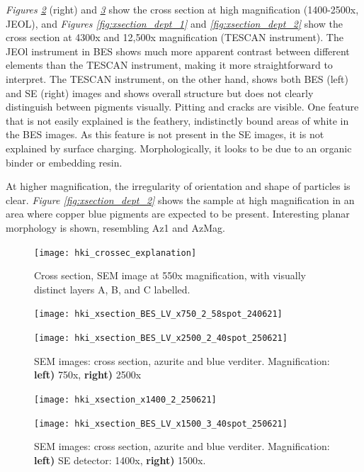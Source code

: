 \textit{Figures \ref{fig:xsection_jeol_1}} (right) and \textit{\ref{fig:xsection_jeol_2}} show the cross section at high magnification (1400-2500x, JEOL), and \textit{Figures \ref{fig:xsection_dept_1}} and \textit{\ref{fig:xsection_dept_2}} show the cross section at 4300x and 12,500x magnification (TESCAN instrument). The JEOl instrument in BES shows much more apparent contrast between different elements than the TESCAN instrument, making it more straightforward to interpret. The TESCAN instrument, on the other hand, shows both BES (left) and SE (right) images and shows overall structure but does not clearly distinguish between pigments visually. Pitting and cracks are visible. One feature that is not easily explained is the feathery, indistinctly bound areas of white in the BES images. As this feature is not present in the SE images, it is not explained by surface charging. Morphologically, it looks to be due to an organic binder or embedding resin.

At higher magnification, the irregularity of orientation and shape of particles is clear. \textit{Figure \ref{fig:xsection_dept_2}} shows the sample at high magnification in an area where copper blue pigments are expected to be present. Interesting planar morphology is shown, resembling Az1 and AzMag.

\begin{figure}[H]
\centering
  \texttt{[image: hki\_crossec\_explanation]}
\caption[Cross section with visually distinct layers A, B, and C labelled]{Cross section, SEM image at 550x magnification, with visually distinct layers A, B, and C labelled.}
\label{fig:hki_crossec_explanation}
\end{figure}

\begin{figure}[H]
\centering
\begin{minipage}{.45\textwidth}
  \centering
  \texttt{[image: hki\_xsection\_BES\_LV\_x750\_2\_58spot\_240621]}     
\end{minipage}
\begin{minipage}{.45\textwidth}
  \centering
  \texttt{[image: hki\_xsection\_BES\_LV\_x2500\_2\_40spot\_250621]}    
\end{minipage}
\caption[SEM images: cross section, azurite and blue verditer]{SEM images: cross section, azurite and blue verditer. Magnification: \textbf{left)} 750x, \textbf{right)} 2500x}
\label{fig:xsection_jeol_1}
\end{figure}

\begin{figure}[H]
\centering
\begin{minipage}{.45\textwidth}
  \centering
  \texttt{[image: hki\_xsection\_x1400\_2\_250621]}
\end{minipage}
\begin{minipage}{.45\textwidth}
  \centering
  \texttt{[image: hki\_xsection\_BES\_LV\_x1500\_3\_40spot\_250621]}
\end{minipage}
\caption[SEM images: cross section, azurite and blue verditer]{SEM images: cross section, azurite and blue verditer. Magnification: \textbf{left)} SE detector: 1400x, \textbf{right)} 1500x.}
\label{fig:xsection_jeol_2}
\end{figure}


